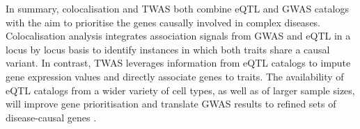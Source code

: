 
In summary, colocalisation and TWAS both combine eQTL and GWAS catalogs with the aim to prioritise the genes causally involved in complex diseases.
Colocalisation analysis integrates association signals from GWAS and eQTL in a locus by locus basis to identify instances in which both traits share a causal variant. 
In contrast, TWAS leverages information from eQTL catalogs to impute gene expression values and directly associate genes to traits. 
The availability of eQTL catalogs from a wider variety of cell types, as well as of larger sample sizes, will improve gene prioritisation and translate GWAS results to refined sets of disease-causal genes \cite{cano2020gwas}.



